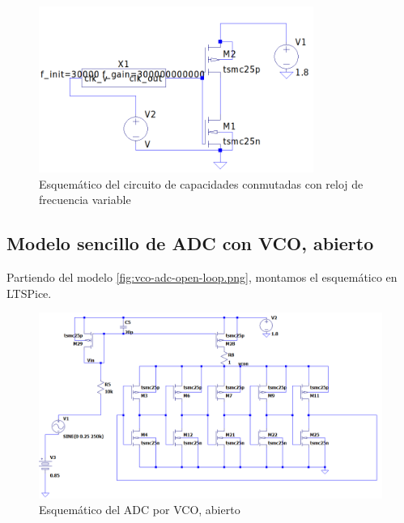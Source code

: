 \documentclass[12pt]{report} %
\begin{document}
	\begin{figure}[H]
		\includegraphics[width=0.8\textwidth]{ltspice-sw-with-clk-freq.png}
		\caption[Esquemático del circuito de capacidades conmutadas con reloj de frecuencia variable]{Esquemático del circuito de capacidades conmutadas con reloj de frecuencia variable}
		\label{fig:ltspice-sw-with-clk-freq.png}
	\end{figure}

	

	
	\subsection{Modelo sencillo de ADC con VCO, abierto} %
	
	Partiendo del modelo \ref{fig:vco-adc-open-loop.png}, montamos el esquemático en LTSPice.
	
	\begin{figure}[H]
		\includegraphics[width=\textwidth]{ltspice-vco-open.png}
		\caption[Esquemático del ADC por VCO, abierto]{Esquemático del ADC por VCO, abierto}
		\label{fig:ltspice-vco-open.png}
	\end{figure}
	
\end{document}
